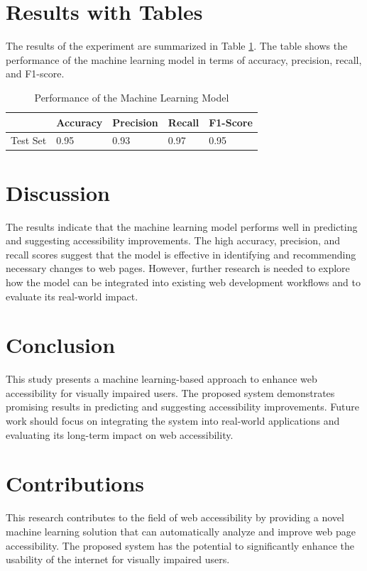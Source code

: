 \documentclass{article}
\begin{document}
\section{Results with Tables}
The results of the experiment are summarized in Table \ref{table:results}. The table shows the performance of the machine learning model in terms of accuracy, precision, recall, and F1-score.

\begin{table}[ht]
    \centering
    \caption{Performance of the Machine Learning Model}
    \label{table:results}
    \begin{tabular}{@{}lllll@{}}
        \toprule
        & Accuracy & Precision & Recall & F1-Score \\
        \midrule
        Test Set & 0.95 & 0.93 & 0.97 & 0.95 \\
        \bottomrule
    \end{tabular}
\end{table}

\section{Discussion}
The results indicate that the machine learning model performs well in predicting and suggesting accessibility improvements. The high accuracy, precision, and recall scores suggest that the model is effective in identifying and recommending necessary changes to web pages. However, further research is needed to explore how the model can be integrated into existing web development workflows and to evaluate its real-world impact.

\section{Conclusion}
This study presents a machine learning-based approach to enhance web accessibility for visually impaired users. The proposed system demonstrates promising results in predicting and suggesting accessibility improvements. Future work should focus on integrating the system into real-world applications and evaluating its long-term impact on web accessibility.

\section{Contributions}
This research contributes to the field of web accessibility by providing a novel machine learning solution that can automatically analyze and improve web page accessibility. The proposed system has the potential to significantly enhance the usability of the internet for visually impaired users.
\end{document}

